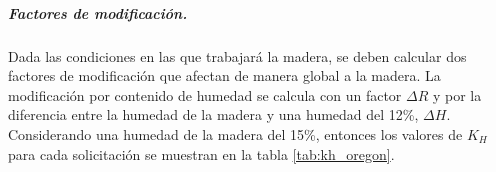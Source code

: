 \subparagraph{Factores de modificación.}
Dada las condiciones en las que trabajará la madera, se deben calcular dos factores de modificación que afectan de manera global a la madera. La modificación por contenido de humedad se calcula con un factor $\Delta R$ y por la diferencia entre la humedad de la madera y una humedad del 12\%, $\Delta H$. Considerando una humedad de la madera del 15\%, entonces los valores de $K_H$ para cada solicitación se muestran en la tabla \ref{tab:kh_oregon}.
\begin{table}[h]
\centering
{}
\caption{Valores del factor de modificación para el pino oregón.}
\label{tab:kh_oregon}
\end{table}

